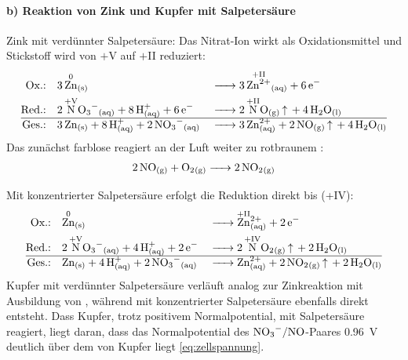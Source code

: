 \paragraph{b) Reaktion von Zink und Kupfer mit Salpetersäure}
Zink mit verdünnter Salpetersäure: Das Nitrat-Ion wirkt als Oxidationsmittel und Stickstoff wird von $+$V auf $+$II reduziert:
\begin{align}
    \text{Ox.:}\quad  & \ce{3 \overset{\mathrm{0}}{\ce{Zn}}_{(s)}                             &  & -> 3 \overset{\mathrm{+II}}{\ce{Zn^{2+}}}_{(aq)} + 6 e^-}   \\
    \text{Red.:}\quad & \ce{2 \overset{\mathrm{+V}}{\ce{N}}O3^-_{(aq)} + 8 H^+_{(aq)} + 6 e^- &  & -> 2 \overset{\mathrm{+II}}{\ce{N}}O_{(g)} ^ + 4 H2O_{(l)}} \\
    \hline
    \text{Ges.:}\quad & \ce{3 Zn_{(s)} + 8 H^+_{(aq)} + 2 NO3^-_{(aq)}                        &  & -> 3 Zn^{2+}_{(aq)} + 2 NO_{(g)} ^ + 4 H2O_{(l)}}
\end{align}
Das zunächst farblose  reagiert an der Luft weiter zu rotbraunem :
\begin{align}
    \ce{2 NO_{(g)} + O2_{(g)} -> 2 NO2_{(g)}}
\end{align}

Mit konzentrierter Salpetersäure erfolgt die Reduktion direkt bis  (+IV):
\begin{align}
    \text{Ox.:}\quad  & \ce{\overset{\mathrm{0}}{\ce{Zn}}_{(s)}}
                      &                                                                        & \ce{-> \overset{\mathrm{+II}}{\ce{Zn}}^{2+}_{(aq)} + 2 e^-}      \\
    \text{Red.:}\quad & \ce{2 \overset{\mathrm{+V}}{\ce{N}}O3^-_{(aq)} + 4 H^+_{(aq)} + 2 e^-}
                      &                                                                        & \ce{-> 2 \overset{\mathrm{+IV}}{\ce{N}}O2_{(g)} ^ + 2 H2O_{(l)}} \\
    \hline
    \text{Ges.:}\quad & \ce{Zn_{(s)} + 4 H^+_{(aq)} + 2 NO3^-_{(aq)}}
                      &                                                                        & \ce{-> Zn^{2+}_{(aq)} + 2 NO2_{(g)} ^ + 2 H2O_{(l)}}
\end{align}
Kupfer mit verdünnter Salpetersäure verläuft analog zur Zinkreaktion mit Ausbildung von , während mit konzentrierter Salpetersäure ebenfalls direkt  entsteht. Dass Kupfer, trotz positivem Normalpotential, mit Salpetersäure reagiert, liegt daran, dass das Normalpotential des $\ce{NO3^-/NO}$-Paares \SI{+0.96}{\volt} deutlich über dem von Kupfer liegt \eqref{eq:zellspannung}.\cite{holleman_wiberg}



